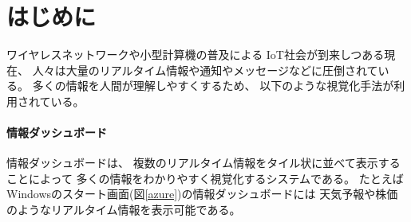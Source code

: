 \section{はじめに}


ワイヤレスネットワークや小型計算機の普及による
IoT社会が到来しつある現在、
人々は大量のリアルタイム情報や通知やメッセージなどに圧倒されている。
%
多くの情報を人間が理解しやすくするため、
以下のような視覚化手法が利用されている。

\vspace{3mm}

\paragraph*{情報ダッシュボード}

情報ダッシュボード\cite{few}は、
複数のリアルタイム情報をタイル状に並べて表示することによって
多くの情報をわかりやすく視覚化するシステムである。
たとえばWindowsのスタート画面(図\ref{azure})の情報ダッシュボードには
天気予報や株価のようなリアルタイム情報を表示可能である。





